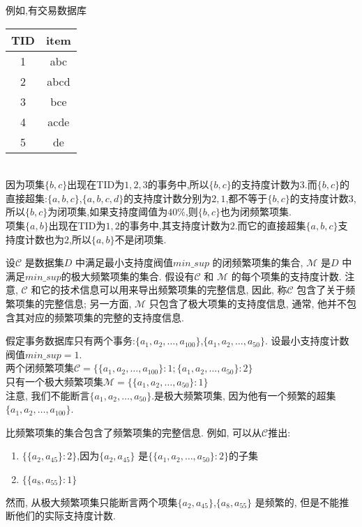 \documentclass{article}
\begin{document}
\begin{example}
例如,有交易数据库
\begin{table}[htbp]  %
  \centering
  \begin{tabular}{|c|c|}
\hline
TID& item\\
\hline
1& abc\\
\hline
2& abcd\\
\hline
3& bce\\
\hline
4& acde\\
\hline
5& de\\
\hline
\end{tabular}
\end{table}\\
因为项集$\{b,c\}$出现在TID为$1,2,3$的事务中,所以$\{b,c\}$的支持度计数为$3$.而$\{b,c\}$的直接超集:$\{a,b,c\}$,$\{a,b,c,d\}$的支持度计数分别为$2,1$,都不等于$\{b,c\}$的支持度计数$3$,所以$\{b,c\}$为闭项集,如果支持度阈值为$40\%$,则$\{b,c\}$也为闭频繁项集.\\
项集$\{a,b\}$出现在TID为$1,2$的事务中,其支持度计数为$2$.而它的直接超集$\{a,b,c\}$支持度计数也为$2$,所以$\{a,b\}$不是闭项集.
\end{example}

设$\mathcal{C}$ 是数据集$D$ 中满足最小支持度阀值$min\_sup$ 的闭频繁项集的集合, $\mathcal{M}$ 是$D$ 中满足$min\_sup$的极大频繁项集的集合.
假设有$\mathcal{C}$ 和 $\mathcal{M}$ 的每个项集的支持度计数.
注意, $\mathcal{C}$ 和它的技术信息可以用来导出频繁项集的完整信息, 因此, 称$\mathcal{C}$ 包含了关于频繁项集的完整信息;
另一方面, $\mathcal{M}$ 只包含了极大项集的支持度信息, 通常, 他并不包含其对应的频繁项集的完整的支持度信息.

\begin{example}
假定事务数据库只有两个事务:$\{a_1,a_2,\dots,a_{100}\}$,$\{a_1,a_2,\dots,a_{50}\}$.
设最小支持度计数阀值$min\_sup = 1$.\\
两个闭频繁项集$\mathcal{C} = \{\{a_1,a_2,\dots,a_{100}\}:1;\{a_1,a_2,\dots,a_{50}\}:2\}$ \\
只有一个极大频繁项集$\mathcal{M} = \{\{a_1,a_2,\dots,a_{50}\}:1\}$ \\
注意, 我们不能断言$\{a_1,a_2,\dots,a_{50}\}$.是极大频繁项集, 因为他有一个频繁的超集$\{a_1,a_2,\dots,a_{100}\}$.\par
比频繁项集的集合包含了频繁项集的完整信息. 例如, 可以从$\mathcal{C}$推出:
\begin{enumerate}
	\item $\{\{a_2,a_{45}\}:2\}$,因为$\{a_2,a_{45}\}$ 是$\{\{a_1,a_2,\dots,a_{50}\}:2\}$的子集
	\item $\{\{a_8,a_{55}\}:1\}$
\end{enumerate}
然而, 从极大频繁项集只能断言两个项集$\{a_2,a_{45}\}$,$\{a_8,a_{55}\}$ 是频繁的, 但是不能推断他们的实际支持度计数.
\end{example}
\end{document}
